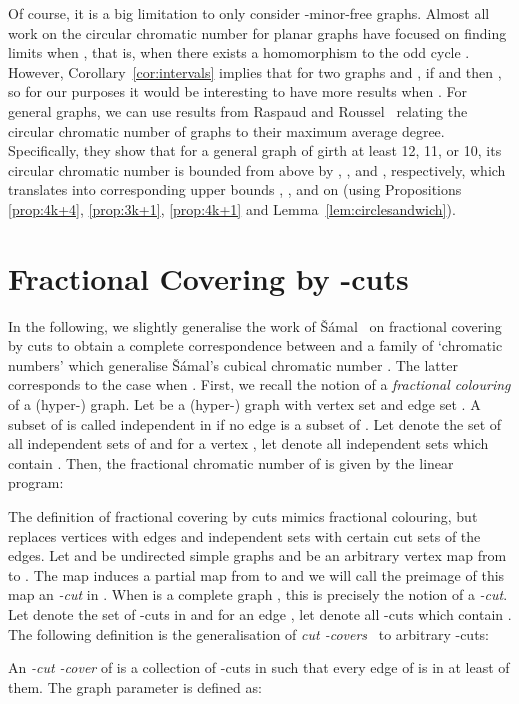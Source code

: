 \documentclass[11pt,a4paper]{article}
\begin{document}
Of course, it is a big limitation to only consider -minor-free
graphs. Almost all work on the circular chromatic number for planar
graphs have focused on finding limits when ,
that is, when there exists a homomorphism to the odd cycle .
However, Corollary~\ref{cor:intervals} implies that for two graphs
 and , if  and  then
, so for our purposes it would be interesting to have
more results when . 
For general graphs, we can use results from Raspaud and
Roussel~\cite{raspaud:rousell:07} relating the circular chromatic number
of graphs to their maximum average degree. Specifically, they show that
for a general graph  of girth at least 12, 11, or 10, its circular
chromatic number is bounded from above by , , and ,
respectively, which translates into corresponding upper bounds ,
, and  on  (using Propositions \ref{prop:4k+4},
\ref{prop:3k+1}, \ref{prop:4k+1} and Lemma~\ref{lem:circlesandwich}).

\section{Fractional Covering by -cuts} \label{sec:cut}

In the following, we slightly generalise the work of 
\v{S}\'{a}mal~\cite{samal:05,samal:06} on fractional
covering by cuts to obtain a complete correspondence between  
and a family of `chromatic numbers'  which generalise 
\v{S}\'{a}mal's cubical chromatic number . 
The latter corresponds to the case when .
First, we recall the notion of a {\em fractional colouring} of a
(hyper-) graph.
Let  be a (hyper-) graph with vertex set  and edge set 
.
A subset  of  is called independent in  if no edge 
 is a subset of .
Let  denote the set of all independent sets of 
and for a vertex , let  
denote all independent sets which contain .
Then, the fractional chromatic number  of  is given by the
linear program:



The definition of fractional covering by cuts mimics fractional colouring,
but replaces vertices with edges and independent sets with certain cut
sets of the edges.
Let  and  be undirected simple graphs and  be an arbitrary
vertex map from  to .
The map  induces a partial map 
from  to  and we will call the preimage of this map an {\em -cut} in .
When  is a complete graph , this is precisely the notion of a
{\em -cut}.
Let  denote the set of -cuts in  and for an edge 
, let  denote all -cuts which
contain .
The following definition is the generalisation of
{\em cut -covers}~\cite{samal:06} to arbitrary -cuts:
\begin{definition}
  An {\em -cut -cover} of  is a collection  of 
  -cuts in  such that every edge of  is in at least  of them.
  The graph parameter  is defined as:
  
\end{definition}
\end{document}
